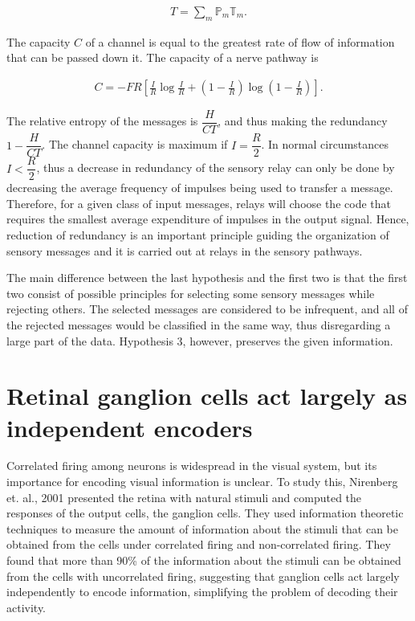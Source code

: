 \documentclass[twoside]{article}
\begin{document}
\begin{multicols}{2}
\begin{align} \label{eq:2}
	T = \sum_m \mathbb{P}_m \mathbb{T}_m.
\end{align}

The capacity $C$ of a channel is equal to the greatest rate of flow of information that can be passed down it. The capacity of a nerve pathway is

\begin{align} \label{eq:3}
	C = - FR \left[\frac{I}{R} \log \frac{I}{R} +\left(1-\frac{I}{R} \right) \log  \left(1-\frac{I}{R} \right) \right].
\end{align}

The relative entropy of the messages is $\dfrac{H}{CT}$, and thus making the redundancy $1-\dfrac{H}{CT}$. The channel capacity is maximum if $I = \dfrac{R}2$. In normal circumstances $I < \dfrac{R}{2}$, thus a decrease in redundancy of the sensory relay can only be done by decreasing the average frequency of impulses being used to transfer a message. Therefore, for a given class of input messages, relays will choose the code that requires the smallest average expenditure of impulses in the output signal. Hence, reduction of redundancy is an important principle guiding the organization of sensory messages and it is carried out at relays in the sensory pathways.

The main difference between the last hypothesis and the first two is that the first two consist of possible principles for selecting some sensory messages while rejecting others. The selected messages are considered to be infrequent, and all of the rejected messages would be classified in the same way, thus disregarding a large part of the data. Hypothesis 3, however, preserves the given information.








\section{Retinal ganglion cells act largely as independent encoders}

\footnotesize
Correlated firing among neurons is widespread in the visual system, but its importance for encoding visual information is unclear. To study this, Nirenberg et. al., 2001 presented the retina with natural stimuli and computed the responses of the output cells, the ganglion cells. They used information theoretic techniques to measure the amount of information about the stimuli that can be obtained from the cells under correlated firing and non-correlated firing. They found that more than 90\% of the information about the stimuli can be obtained from the cells with uncorrelated firing, suggesting that ganglion cells act largely independently to encode information, simplifying the problem of decoding their activity. 


\end{multicols}
\end{document}
